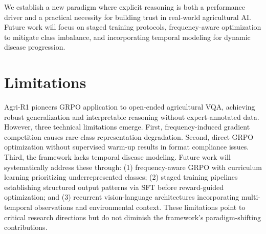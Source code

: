 \documentclass[11pt]{article}
\begin{document}
We establish a new paradigm where explicit reasoning is both a performance driver and a practical necessity for building trust in real-world agricultural AI. Future work will focus on staged training protocols, frequency-aware optimization to mitigate class imbalance, and incorporating temporal modeling for dynamic disease progression.








\clearpage
\section*{Limitations}
Agri-R1 pioneers GRPO application to open-ended agricultural VQA, achieving robust generalization and interpretable reasoning without expert-annotated data. However, three technical limitations emerge. First, frequency-induced gradient competition causes rare-class representation degradation. Second, direct GRPO optimization without supervised warm-up results in format compliance issues. Third, the framework lacks temporal disease modeling. Future work will systematically address these through: (1) frequency-aware GRPO with curriculum learning prioritizing underrepresented classes; (2) staged training pipelines establishing structured output patterns via SFT before reward-guided optimization; and (3) recurrent vision-language architectures incorporating multi-temporal observations and environmental context. These limitations point to critical research directions but do not diminish the framework's paradigm-shifting contributions.
\end{document}

